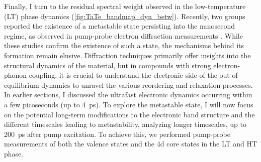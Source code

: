 Finally, I turn to the residual spectral weight observed in the low-temperature (LT) phase dynamics (\ref{fig:TaTe_bandmap_dyn_betw}).
Recently, two groups reported the existence of a metastable state persisting into the nanosecond regime, as observed in pump-probe electron diffraction measurements \cite{siddiqui_ultrafast_2021, domrose_femtosecond_2024}.
While these studies confirm the existence of such a state, the mechanisms behind its formation remain elusive.
Diffraction techniques primarily offer insights into the structural dynamics of the material, but in compounds with strong electron-phonon coupling, it is crucial to understand the electronic side of the out-of-equilibrium dynamics to unravel the various reordering and relaxation processes.
In earlier sections, I discussed the ultrafast electronic dynamics occurring within a few picoseconds (up to \qty{4}{\pico\second}).
To explore the metastable state, I will now focus on the potential long-term modifications to the electronic band structure and the different timescales leading to metastability, analyzing longer timescales, up to \qty{200}{\pico\second} after pump excitation.
To achieve this, we performed pump-probe measurements of both the valence states and the  4d core states in the LT and HT phase.

